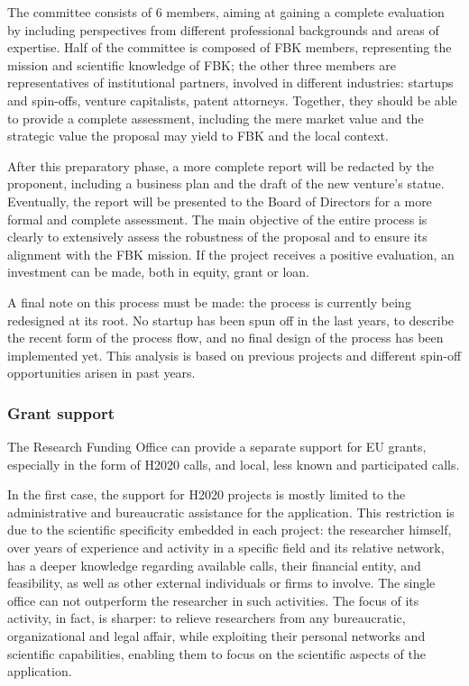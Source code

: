 The committee consists of 6 members, aiming at gaining a complete evaluation by including perspectives from different professional backgrounds and areas of expertise. Half of the committee is composed of FBK members, representing the mission and scientific knowledge of FBK; the other three members are representatives of institutional partners, involved in different industries: startups and spin-offs, venture capitalists, patent attorneys. Together, they should be able to provide a complete assessment, including the mere market value and the strategic value the proposal may yield to FBK and the local context.

After this preparatory phase, a more complete report will be redacted by the proponent, including a business plan and the draft of the new venture's statue. Eventually, the report will be presented to the Board of Directors for a more formal and complete assessment. The main objective of the entire process is clearly to extensively assess the robustness of the proposal and to ensure its alignment with the FBK mission. If the project receives a positive evaluation, an investment can be made, both in equity, grant or loan.

A final note on this process must be made: the process is currently being redesigned at its root. No startup has been spun off in the last years, to describe the recent form of the process flow, and no final design of the process has been implemented yet. This analysis is based on previous projects and different spin-off opportunities arisen in past years.	

\subsubsection{Grant support}

The Research Funding Office can provide a separate support for EU grants, especially in the form of H2020 calls, and local, less known and participated calls.

In the first case, the support for H2020 projects is mostly limited to the administrative and bureaucratic assistance for the application. This restriction is due to the scientific specificity embedded in each project: the researcher himself, over years of experience and activity in a specific field and its relative network, has a deeper knowledge regarding available calls, their financial entity, and feasibility, as well as other external individuals or firms to involve. The single office can not outperform the researcher in such activities. The focus of its activity, in fact, is sharper: to relieve researchers from any bureaucratic, organizational and legal affair, while exploiting their personal networks and scientific capabilities, enabling them to focus on the scientific aspects of the application.

